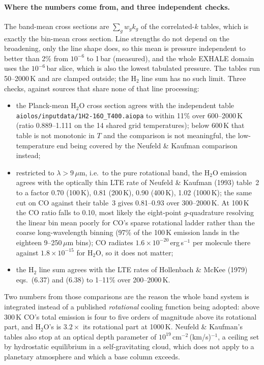 \documentclass[english,a4paper]{my_memo}
\begin{document}
\paragraph{Where the numbers come from, and three independent checks.}
The band-mean cross sections are $\sum_g w_g k_g$ of the correlated-$k$ tables,
which is exactly the bin-mean cross section. Line strengths do not depend on the
broadening, only the line shape does, so this mean is pressure independent to
better than 2\% from $10^{-6}$ to 1\,bar (measured), and the whole EXHALE
domain uses the $10^{-6}$\,bar slice, which is also the lowest tabulated
pressure. The tables run 50--2000\,K and are clamped outside; the H$_2$ line sum
has no such limit. Three checks, against sources that share none of that line
processing:
\begin{itemize}\itemsep2pt
\item the Planck-mean H$_2$O cross section agrees with the independent table
  \texttt{aiolos/\allowbreak inputdata/\allowbreak 1H2-16O\_\allowbreak T400.aiopa} to within 11\% over
  600--2000\,K (ratio 0.889--1.111 on the 14 shared grid temperatures); below
  600\,K that table is not monotonic in $T$ and the comparison is not
  meaningful, the low-temperature end being covered by the Neufeld \& Kaufman
  comparison instead;
\item restricted to $\lambda>9$\,$\mu$m, i.e.\ to the pure rotational band, the
  H$_2$O emission agrees with the optically thin LTE rate of Neufeld \& Kaufman
  (1993) table~2 to a factor 0.70 (100\,K), 0.81 (200\,K), 0.90 (400\,K), 1.02
  (1000\,K); the same cut on CO against their table~3 gives 0.81--0.93 over
  300--2000\,K. At 100\,K the CO ratio falls to 0.10, most likely the
  eight-point $g$-quadrature resolving the linear bin mean poorly for CO's
  sparse rotational ladder rather than the coarse long-wavelength binning
  (97\% of the 100\,K emission lands in the eighteen 9--250\,$\mu$m bins); CO
  radiates $1.6\times10^{-20}$\,erg\,s$^{-1}$ per molecule there against
  $1.8\times10^{-15}$ for H$_2$O, so it does not matter;
\item the H$_2$ line sum agrees with the LTE rates of Hollenbach \& McKee (1979)
  eqs.~(6.37) and (6.38) to 1--11\% over 200--2000\,K.
\end{itemize}
Two numbers from those comparisons are the reason the whole band system is
integrated instead of a published \emph{rotational} cooling function being
adopted: above 300\,K CO's total emission is four to five orders of magnitude
above its rotational part, and H$_2$O's is $3.2\times$ its rotational part at
1000\,K. Neufeld \& Kaufman's tables also stop at an optical depth parameter of
$10^{19}$\,cm$^{-2}$\,(km/s)$^{-1}$, a ceiling set by hydrostatic equilibrium in
a self-gravitating cloud, which does not apply to a planetary atmosphere and
which a base column exceeds.
\end{document}
